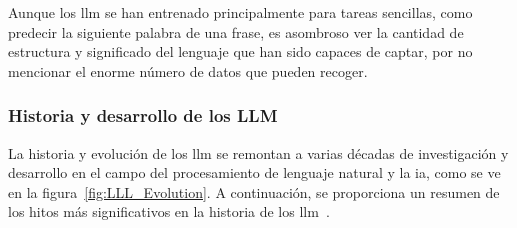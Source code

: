 Aunque los \acrshort{llm}  se han entrenado principalmente para tareas sencillas, como predecir la siguiente palabra de una frase, es asombroso ver la cantidad de estructura y significado del lenguaje que han sido capaces de captar, por no mencionar el enorme número de datos que pueden recoger.

\subsubsection{Historia y desarrollo de los LLM}

La historia y evolución de los \acrshort{llm} se remontan a varias décadas de investigación y desarrollo en el campo del procesamiento de lenguaje natural y la \acrlong{ia}, como se ve en la figura~\ref{fig:LLL_Evolution}. A continuación, se proporciona un resumen de los hitos más significativos en la historia de los \acrshort{llm}~\cite{zhao2023survey,scribbleData,Tolaka}.


